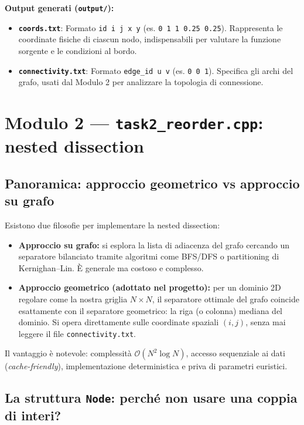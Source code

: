 \documentclass[a4paper,11pt]{article}
\theoremstyle{definition}
\begin{document}
\textbf{Output generati (\texttt{output/}):}
\begin{itemize}
  \item \textbf{\texttt{coords.txt}}: Formato \texttt{id i j x y} (es. \texttt{0 1 1 0.25 0.25}). Rappresenta le coordinate fisiche di ciascun nodo, indispensabili per valutare la funzione sorgente e le condizioni al bordo.
  \item \textbf{\texttt{connectivity.txt}}: Formato \texttt{edge\_id u v} (es. \texttt{0 0 1}). Specifica gli archi del grafo, usati dal Modulo 2 per analizzare la topologia di connessione.
\end{itemize}

\newpage
\section{Modulo 2 — \texttt{task2\_reorder.cpp}: nested dissection}

\subsection{Panoramica: approccio geometrico vs approccio su grafo}

Esistono due filosofie per implementare la nested dissection:
\begin{itemize}
  \item \textbf{Approccio su grafo:} si esplora la lista di adiacenza del grafo cercando un separatore bilanciato tramite algoritmi come BFS/DFS o partitioning di Kernighan--Lin. È generale ma costoso e complesso.
  \item \textbf{Approccio geometrico (adottato nel progetto):} per un dominio 2D regolare come la nostra griglia $N \times N$, il separatore ottimale del grafo coincide esattamente con il separatore geometrico: la riga (o colonna) mediana del dominio. Si opera direttamente sulle coordinate spaziali $(i, j)$, senza mai leggere il file \texttt{connectivity.txt}.
\end{itemize}
Il vantaggio è notevole: complessità $\mathcal{O}(N^2 \log N)$, accesso sequenziale ai dati (\emph{cache-friendly}), implementazione deterministica e priva di parametri euristici.

\subsection{La struttura \texttt{Node}: perché non usare una coppia di interi?}
\end{document}
